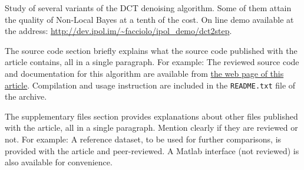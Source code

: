 \documentclass{ipol}
\begin{document}



\begin{ipolAbstract}
Study of several variants of the DCT denoising algorithm. Some of them attain the quality of Non-Local Bayes at a tenth of the cost. On line demo available at the address: \url{http://dev.ipol.im/~facciolo/ipol_demo/dct2step}.
\end{ipolAbstract}


\begin{ipolCode}
The source code section briefly explains what the source code
published with the article contains, all in a single paragraph. For
example: The reviewed source code and documentation for this algorithm
are available from \href{\ipolLink}{the web page of this
  article}. Compilation and usage instruction are included in the
\verb|README.txt| file of the archive.
\end{ipolCode}



\begin{ipolSupp}
The supplementary files section provides explanations about other
files published with the article, all in a single paragraph. Mention
clearly if they are reviewed or not. For example: A reference dataset,
to be used for further comparisons, is provided with the article and
peer-reviewed. A Matlab interface (not reviewed) is also available for
convenience.
\end{ipolSupp}
\end{document}
